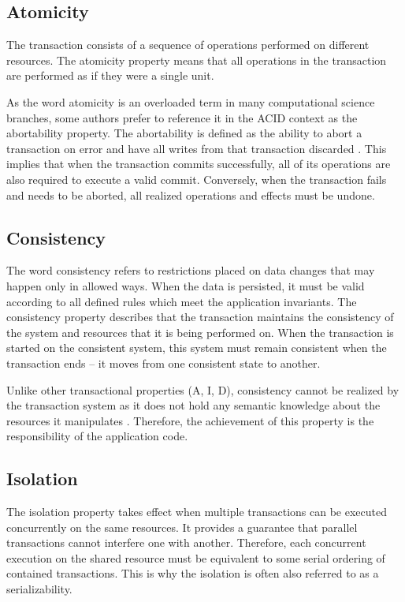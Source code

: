 \documentclass[oneside,
  digital, %
  table,   %
  lof,     %
  lot,     %
]{fithesis3}
\begin{document}
\subsection{Atomicity}

The transaction consists of a sequence of operations performed on different resources. The atomicity property means that all operations in the transaction are performed as if they were a single unit. 

As the word atomicity is an overloaded term in many computational science branches, some authors prefer to reference it in the ACID context as the abortability property. The abortability is defined as the ability to abort a transaction on error and have all writes from that transaction discarded \cite{design_data_intens_apps}. This implies that when the transaction commits successfully, all of its operations are also required to execute a valid commit. Conversely, when the transaction fails and needs to be aborted, all realized operations and effects must be undone.

\subsection{Consistency}

The word consistency refers to restrictions placed on data changes that may happen only in allowed ways. When the data is persisted, it must be valid according to all defined rules which meet the application invariants. The consistency property describes that the transaction maintains the consistency of the system and resources that it is being performed on. When the transaction is started on the consistent system, this system must remain consistent when the transaction ends -- it moves from one consistent state to another.

Unlike other transactional properties (A, I, D), consistency cannot be realized by the transaction system as it does not hold any semantic knowledge about the resources it manipulates \cite{java_tran_processing}. Therefore, the achievement of this property is the responsibility of the application code.

\subsection{Isolation}

The isolation property takes effect when multiple transactions can be executed concurrently on the same resources. It provides a guarantee that parallel transactions cannot interfere one with another. Therefore, each concurrent execution on the shared resource must be equivalent to some serial ordering of contained transactions. This is why the isolation is often also referred to as a serializability.
\end{document}
